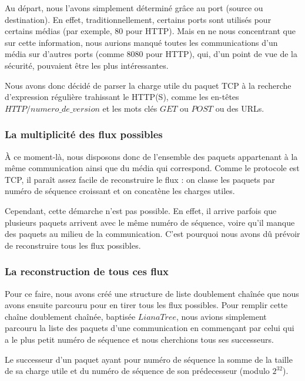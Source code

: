 Au départ, nous l'avons simplement déterminé grâce au port (source ou destination). En effet, traditionnellement,
certains ports sont utilisés pour certains médias (par exemple, 80 pour HTTP). Mais en ne nous concentrant que sur cette information, nous aurions manqué
toutes les communications d'un média sur d'autres ports (comme 8080 pour HTTP), qui, d'un point de vue de la sécurité, pouvaient être les plus intéressantes.


Nous avons donc décidé de parser la charge utile du paquet TCP à la recherche d'expression régulière trahissant le HTTP(S), comme les en-têtes
 $HTTP/numero\_de\_version$ et les mots clés $GET$ ou $POST$ ou des URLs.


\subsubsection{La multiplicité des flux possibles}%
À ce moment-là, nous disposons donc de l'ensemble des paquets appartenant à la même communication ainsi que du média qui correspond. Comme le protocole est TCP,
il paraît assez facile de reconstruire le flux : on classe les paquets par numéro de séquence croissant et on concatène les charges utiles.

 Cependant, cette démarche 
n'est pas possible. En effet, il arrive parfois que plusieurs paquets arrivent avec le même numéro de séquence, voire qu'il manque des paquets au milieu de la communication.
C'est pourquoi nous avons dû prévoir de reconstruire tous les flux possibles.


\subsubsection{La reconstruction de tous ces flux}%
Pour ce faire, nous avons créé une structure de liste doublement chaînée que nous avons ensuite parcouru pour en tirer tous les flux possibles. Pour remplir cette chaîne
doublement chaînée, baptisée $LianaTree$, nous avions simplement parcouru la liste des paquets d'une communication en commençant par celui qui a le plus petit numéro de séquence et 
nous cherchions tous ses successeurs. 

Le successeur d'un paquet ayant pour numéro de séquence la somme de la taille de sa charge utile et du numéro de séquence de son prédecesseur 
(modulo $2^{32}$).

